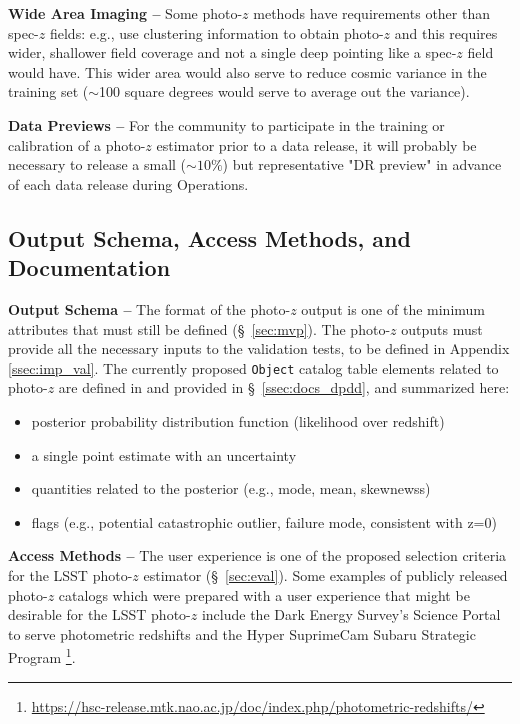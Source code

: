 \documentclass[DM,lsstdraft,toc]{lsstdoc}
\begin{document}
{\bf Wide Area Imaging --} 
Some photo-$z$ methods have requirements other than spec-$z$ fields: e.g., \citet{2019MNRAS.483.2801S} use clustering information to obtain photo-$z$ and this requires wider, shallower field coverage and not a single deep pointing like a spec-$z$ field would have. 
This wider area would also serve to reduce cosmic variance in the training set ($\sim$100 square degrees would serve to average out the variance).

{\bf Data Previews --}
For the community to participate in the training or calibration of a photo-$z$ estimator prior to a data release, it will probably be necessary to release a small ($\sim10\%$) but representative "DR preview" in advance of each data release during Operations.


\subsection{Output Schema, Access Methods, and Documentation}\label{ssec:dp_pz}

{\bf Output Schema --} 
The format of the photo-$z$ output is one of the minimum attributes that must still be defined (\S~\ref{sec:mvp}). 
The photo-$z$ outputs must provide all the necessary inputs to the validation tests, to be defined in Appendix \ref{ssec:imp_val}.
The currently proposed {\tt Object} catalog table elements related to photo-$z$ are defined in  and provided in \S~\ref{ssec:docs_dpdd}, and summarized here:
\vspace{-15pt}
\begin{itemize}
\item posterior probability distribution function (likelihood over redshift)
\item a single point estimate with an uncertainty
\item quantities related to the posterior (e.g., mode, mean, skewnewss)
\item flags (e.g., potential catastrophic outlier, failure mode, consistent with z=0)
\end{itemize}

{\bf Access Methods --} 
The user experience is one of the proposed selection criteria for the LSST photo-$z$ estimator (\S~\ref{sec:eval}). 
Some examples of publicly released photo-$z$ catalogs which were prepared with a user experience that might be desirable for the LSST photo-$z$ include the Dark Energy Survey's Science Portal to serve photometric redshifts \cite{2018A&C....25...58G} and the Hyper SuprimeCam Subaru Strategic Program \cite{2018PASJ...70S...9T}\footnote{\url{https://hsc-release.mtk.nao.ac.jp/doc/index.php/photometric-redshifts/}}.
\end{document}
